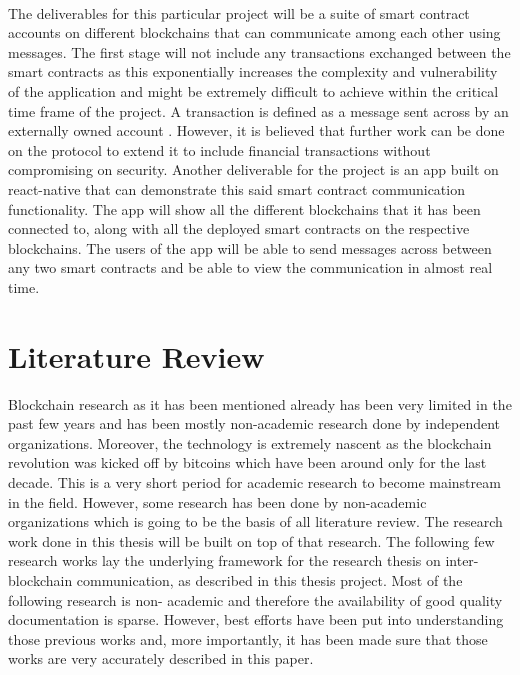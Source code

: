 \documentclass[a4paper,twoside,phd]{BYUPhys}
\begin{document}
\\
The deliverables for this particular project will be a suite of smart contract accounts on different blockchains that can communicate among each other using messages. The first stage will not include any transactions exchanged between the smart contracts as this exponentially increases the complexity and vulnerability of the application and might be extremely difficult to achieve within the critical time frame of the project. A transaction is defined as a message sent across by an externally owned account \cite{ButerinAPLATFORM}. However, it is believed that further work can be done on the protocol to extend it to include financial transactions without compromising on security. Another deliverable for the project is an app built on react-native that can demonstrate this said smart contract communication functionality. The app will show all the different blockchains that it has been connected to, along with all the deployed smart contracts on the respective blockchains. The users of the app will be able to send messages across between any two smart contracts and be able to view the communication in almost real time.
\section{Literature Review}
Blockchain research as it has been mentioned already has been very limited in the past few years and has been mostly non-academic research done by independent organizations. Moreover, the technology is extremely nascent as the blockchain revolution was kicked off by bitcoins which have been around only for the last decade. This is a very short period for academic research to become mainstream in the field. However, some research has been done by non-academic organizations which is going to be the basis of all literature review. The research work done in this thesis will be built on top of that research. The following few research works lay the underlying framework for the research thesis on inter-blockchain communication, as described in this thesis project. Most of the following research is non- academic and therefore the availability of good quality documentation is sparse. However, best efforts have been put into understanding those previous works and, more importantly, it has been made sure that those works are very accurately described in this paper.
\end{document}
